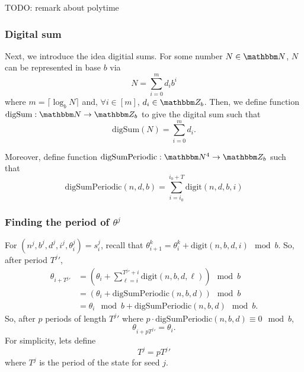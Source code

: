 \documentclass[11pt,titlepage]{article}
\begin{document}
\begin{remark}[Polytime]
  TODO: remark about polytime
\end{remark}

\subsubsection{Digital sum}
Next, we introduce the idea digitial sums.
For some number $N \in \N$, $N$ can be represented in base $b$ via
\begin{equation}
  N = \sum_{i=0}^{m} d_i b^i
\end{equation}
where $m = \lceil \log_b N \rceil$ and, $\forall i \in [m]$, $d_i \in \Z_b$.
Then, we define function $\mathrm{digSum}: \N \rightarrow \Z_b$
to give the digital sum such that
\begin{equation}
  \mathrm{digSum}(N) = \sum_{i=0}^{m} d_i.
\end{equation}

Moreover, define function $\mathrm{digSumPeriodic}: \N^4 \rightarrow \Z_b$
such that
\begin{equation}
  \mathrm{digSumPeriodic}(n, d, b) = \sum_{i = i_0}^{i_0 + T} \mathrm{digit}(n, d, b, i)
\end{equation}



\begin{remark}
  
\end{remark}

\subsubsection{Finding the period of $\theta^j$} %
For $(n^j, b^j, d^j, i^j, \theta_i^j) = s_i^j$,
recall that $\theta_{i+1}^k = \theta_{i}^k + \mathrm{digit}(n, b, d, i) \mod b$.
So, after period ${T^j}'$,
\begin{align*}
  \theta_{i + {T^j}'} &= \left(\theta_{i} + \sum_{\ell = i}^{{T^j}' + i} \mathrm{digit}(n, b, d, \ell)\right) \mod b\\
  &= \left(\theta_{i} + \mathrm{digSumPeriodic}(n, b, d)\right) \mod b\\
  &= \theta_{i} \mod b + \mathrm{digSumPeriodic}(n, b, d) \mod b.
\end{align*}
So, after $p$ periods of length ${T^j}'$ where $p \cdot \mathrm{digSumPeriodic}(n, b, d) \equiv 0 \mod b$,
$$
\theta_{i + p{T^j}'} = \theta_i.
$$
For simplicity, lets define
$$
  T^j = p{T^j}'
$$
where $T^j$ is the period of the state for seed $j$.
\end{document}
